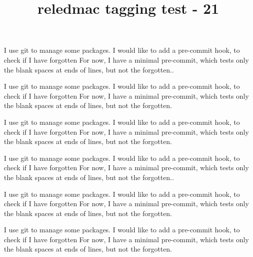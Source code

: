 \documentclass{book}
\title{reledmac tagging test - 21}
\begin{document}
\beginnumbering

\beforeeledchapter
\pstart
{}
\pend

\pstart
I use git to manage some packages.
I would like to add a pre-commit hook, to check if I have forgotten
For now, I have a minimal pre-commit, which tests only the blank spaces at ends of lines, but not the forgotten..
\pend

\pstart
{}
\pend

\pstart
{}
\pend

\pstart
{}
\pend

\pstart
I use git to manage some packages.
I would like to add a pre-commit hook, to check if I have forgotten
For now, I have a minimal pre-commit, which tests only the blank spaces at ends of lines, but not the forgotten.
\pend

\pstart
{}
\pend

\pstart
I use git to manage some packages.
I would like to add a pre-commit hook, to check if I have forgotten
For now, I have a minimal pre-commit, which tests only the blank spaces at ends of lines, but not the forgotten.
\pend


\beforeeledchapter
\pstart
{}
\pend

\pstart
I use git to manage some packages.
I would like to add a pre-commit hook, to check if I have forgotten
For now, I have a minimal pre-commit, which tests only the blank spaces at ends of lines, but not the forgotten..
\pend

\pstart
{}
\pend

\pstart
{}
\pend

\pstart
{}
\pend

\pstart
I use git to manage some packages.
I would like to add a pre-commit hook, to check if I have forgotten
For now, I have a minimal pre-commit, which tests only the blank spaces at ends of lines, but not the forgotten.
\pend

\pstart
{}
\pend

\pstart
I use git to manage some packages.
I would like to add a pre-commit hook, to check if I have forgotten
For now, I have a minimal pre-commit, which tests only the blank spaces at ends of lines, but not the forgotten.
\pend

\endnumbering
\end{document}
